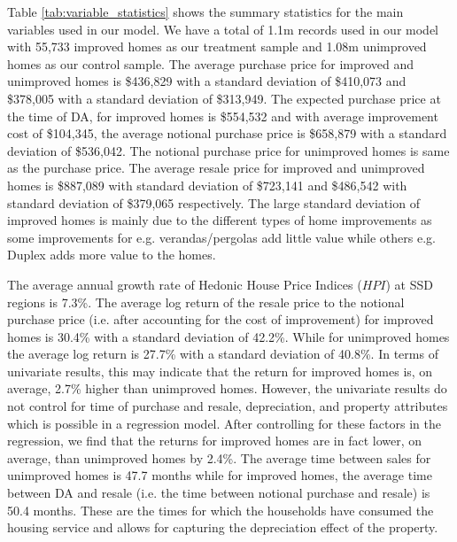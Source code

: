 \documentclass[AEJ,reqno, draftmode]{AEA} %
\begin{document}
Table \ref{tab:variable_statistics} shows the summary statistics for the main variables used in our model. We have a total of 1.1m records used in our model with 55,733 improved homes as our treatment sample and 1.08m unimproved homes as our control sample. The average purchase price for improved and unimproved homes is \$436,829 with a standard deviation of \$410,073 and \$378,005 with a standard deviation of \$313,949. The expected purchase price at the time of DA, for improved homes is \$554,532 and with average improvement cost of \$104,345, the average notional purchase price is \$658,879 with a standard deviation of \$536,042. The notional purchase price for unimproved homes is same as the purchase price. The average resale price for improved and unimproved homes is \$887,089 with standard deviation of \$723,141 and \$486,542 with standard deviation of \$379,065 respectively. The large standard deviation of improved homes is mainly due to the different types of home improvements as some improvements for e.g. verandas/pergolas add little value while others e.g. Duplex adds more value to the homes.

The average annual growth rate of Hedonic House Price Indices ($HPI$) at SSD regions is 7.3\%. The average log return of the resale price to the notional purchase price (i.e. after accounting for the cost of improvement) for improved homes is 30.4\% with a standard deviation of 42.2\%. While for unimproved homes the average log return is 27.7\% with a standard deviation of 40.8\%. In terms of univariate results, this may indicate that the return for improved homes is, on average, 2.7\% higher than unimproved homes. However, the univariate results do not control for time of purchase and resale, depreciation, and property attributes which is possible in a regression model. After controlling for these factors in the regression, we find that the returns for improved homes are in fact lower, on average, than unimproved homes by 2.4\%. The average time between sales for unimproved homes is 47.7 months while for improved homes, the average time between DA and resale (i.e. the time between notional purchase and resale) is 50.4 months. These are the times for which the households have consumed the housing service and allows for capturing the depreciation effect of the property.
\end{document}
